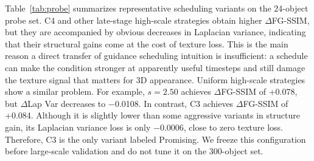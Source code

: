 \documentclass[times,twocolumn,final]{elsarticle}
\begin{document}
\begin{table}[t]
\centering
\caption{Shape-texture trade-off on the 24-object probe set. Delta texture metrics are computed relative to the corresponding ground-truth foreground renderings under the same views and masks; $\Delta$Lap Var closer to 0 indicates smaller texture loss.}
\label{tab:probe}
\end{table}

Table~\ref{tab:probe} summarizes representative scheduling variants on the 24-object probe set. C4 and other late-stage high-scale strategies obtain higher $\Delta$FG-SSIM, but they are accompanied by obvious decreases in Laplacian variance, indicating that their structural gains come at the cost of texture loss. This is the main reason a direct transfer of guidance scheduling intuition is insufficient: a schedule can make the condition stronger at apparently useful timesteps and still damage the texture signal that matters for 3D appearance. Uniform high-scale strategies show a similar problem. For example, $s = 2.50$ achieves $\Delta$FG-SSIM of +0.078, but $\Delta$Lap Var decreases to $-$0.0108. In contrast, C3 achieves $\Delta$FG-SSIM of +0.084. Although it is slightly lower than some aggressive variants in structure gain, its Laplacian variance loss is only $-$0.0006, close to zero texture loss. Therefore, C3 is the only variant labeled Promising. We freeze this configuration before large-scale validation and do not tune it on the 300-object set.
\end{document}
